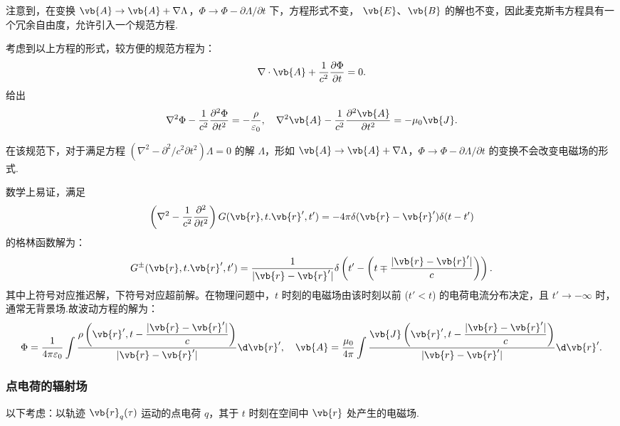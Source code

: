 注意到，在变换 \(\vb{A} \to \vb{A} + \nabla \Lambda\)，\(\Phi \to \Phi - \partial \Lambda/\partial t\) 下，方程形式不变，
\(\vb{E}\)、\(\vb{B}\) 的解也不变，因此麦克斯韦方程具有一个冗余自由度，允许引入一个规范方程.

考虑到以上方程的形式，较方便的规范方程为：
\begin{equation*}
	\nabla \cdot \vb{A} + \dfrac{1}{c^2} \dfrac{\partial \Phi}{\partial t} = 0.
\end{equation*}
给出
\begin{equation*}
	\nabla^2 \Phi - \dfrac{1}{c^2} \dfrac{\partial^2 \Phi}{\partial t^2} = -\dfrac{\rho}{\varepsilon_0},\quad
	\nabla^2 \vb{A} - \dfrac{1}{c^2} \dfrac{\partial^2 \vb{A}}{\partial t^2} = -\mu_0 \vb{J}.
\end{equation*}

在该规范下，对于满足方程 \(\left( \nabla^2 - \partial^2/c^2\partial t^2 \right) \Lambda = 0\) 的解 \(\Lambda\)，形如 \(\vb{A} \to \vb{A} + \nabla \Lambda\)，\(\Phi \to \Phi - \partial\Lambda/\partial t\) 的变换不会改变电磁场的形式.

数学上易证，满足
\begin{equation*}
	\left( \nabla^2 - \dfrac{1}{c^2} \dfrac{\partial^2}{\partial t^2} \right) G(\vb{r}, t. \vb{r}', t') = -4\pi \delta(\vb{r} - \vb{r}') \delta(t - t')
\end{equation*}
的格林函数解为：
\begin{equation*}
	G^{\pm}(\vb{r}, t. \vb{r}', t') = \dfrac{1}{|\vb{r} - \vb{r}'|} \delta\left( t' - \left( t \mp \dfrac{|\vb{r} - \vb{r}'|}{c} \right) \right).
\end{equation*}
其中上符号对应推迟解，下符号对应超前解。在物理问题中，\(t\) 时刻的电磁场由该时刻以前 (\(t' < t\)) 的电荷电流分布决定，且 \(t' \to -\infty\) 时，通常无背景场.故波动方程的解为：
\begin{equation*}
	\Phi = \dfrac{1}{4\pi \varepsilon_0} \int \dfrac{\rho\left( \vb{r}', t - \dfrac{|\vb{r} - \vb{r}'|}{c} \right)}{|\vb{r} - \vb{r}'|} \d \vb{r}',\quad
	\vb{A} = \dfrac{\mu_0}{4\pi} \int \dfrac{\vb{J}\left( \vb{r}', t - \dfrac{|\vb{r} - \vb{r}'|}{c} \right)}{|\vb{r} - \vb{r}'|} \d \vb{r}'.
\end{equation*}

\subsubsection{点电荷的辐射场}
以下考虑：以轨迹 \(\vb{r}_q(\tau)\) 运动的点电荷 \(q\)，其于 \(t\) 时刻在空间中 \(\vb{r}\) 处产生的电磁场.

